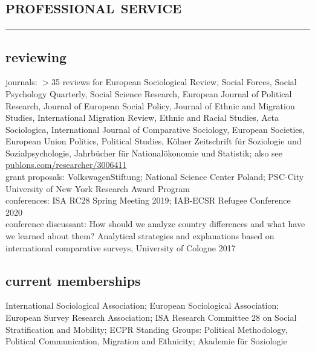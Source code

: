 \documentclass[11pt, a4paper]{article}
\begin{document}
\section*{\textsc{professional service}}
\vskip-20pt{\noindent\rule{\textwidth}{1pt}}
\noindent
\subsection*{reviewing}
journals: $>$35 reviews for European Sociological Review, Social Forces, Social Psychology Quarterly, Social Science Research, European Journal of Political Research, Journal of European Social Policy, Journal of Ethnic and Migration Studies, International Migration Review, Ethnic and Racial Studies, Acta Sociologica, International Journal of Comparative Sociology, European Societies, European Union Politics, Political Studies, Kölner Zeitschrift für Soziologie und Sozialpsychologie, Jahrbücher für Nationalökonomie und Statistik; also see \href{https://publons.com/researcher/3006411/christian-s-czymara/}{publons.com/researcher/3006411}\\

grant proposals: VolkswagenStiftung; National Science Center Poland; PSC-City University of New York Research Award Program\\

conferences: ISA RC28 Spring Meeting 2019; IAB-ECSR Refugee Conference 2020\\

conference discussant: How should we analyze country differences and what have we learned about them? Analytical strategies and explanations based on international comparative surveys, University of Cologne 2017\\
\subsection*{current memberships}
International Sociological Association; European Sociological Association; European Survey Research Association; ISA Research Committee 28 on Social Stratification and Mobility; ECPR Standing Groups: Political Methodology, Political Communication, Migration and Ethnicity; Akademie für Soziologie\\
\end{document}
